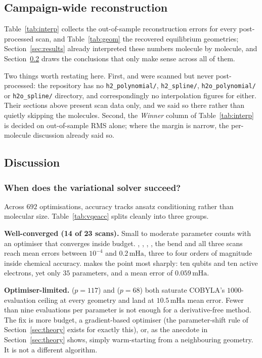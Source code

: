\documentclass[sigconf,screen,nonacm]{acmart}
\newcommand{\mHa}{\,\text{mHa}}
\begin{document}


\subsection{Campaign-wide reconstruction}
\label{sec:recon}
Table~\ref{tab:interp} collects the out-of-sample reconstruction errors for
every post-processed scan, and Table~\ref{tab:geom} the recovered
equilibrium geometries; Section~\ref{sec:results} already interpreted these
numbers molecule by molecule, and Section~\ref{sec:discussion} draws the
conclusions that only make sense across all of them.

Two things worth restating here. First,  and  were scanned but
never post-processed: the repository has no \texttt{h2\_polynomial/},
\texttt{h2\_spline/}, \texttt{h2o\_polynomial/} or \texttt{h2o\_spline/}
directory, and correspondingly no interpolation figures for either. Their
sections above present scan data only, and we said so there rather than
quietly skipping the molecules. Second, the \emph{Winner} column of
Table~\ref{tab:interp} is decided on out-of-sample RMS alone; where the
margin is narrow, the per-molecule discussion already said so.




\subsection{Discussion}
\label{sec:discussion}
\subsubsection{When does the variational solver succeed?}

Across $692$ optimisations, accuracy tracks ansatz conditioning rather than
molecular size. Table~\ref{tab:vqeacc} splits cleanly into three groups.

\textbf{Well-converged (14 of 23 scans).} Small to moderate parameter counts
with an optimiser that converges inside budget. , , ,
, the  bend and all three  scans reach mean errors
between $10^{-4}$ and $0.2\mHa$, three to four orders of magnitude inside
chemical accuracy.  makes the point most sharply: ten qubits and ten
active electrons, yet only $35$ parameters, and a mean error of $0.059\mHa$.

\textbf{Optimiser-limited.}  ($p=117$) and  ($p=68$) both
saturate COBYLA's $1000$-evaluation ceiling at every geometry and land at
$10.5\mHa$ mean error. Fewer than nine evaluations per parameter is not
enough for a derivative-free method. The fix is more budget, a
gradient-based optimiser (the parameter-shift rule of
Section~\ref{sec:theory} exists for exactly this), or, as the
 anecdote in Section~\ref{sec:theory} shows, simply warm-starting from
a neighbouring geometry. It is not a different algorithm.
\end{document}
